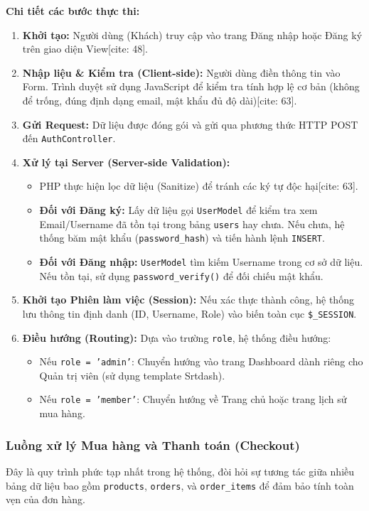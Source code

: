 \textbf{Chi tiết các bước thực thi:}
\begin{enumerate}
    \item \textbf{Khởi tạo:} Người dùng (Khách) truy cập vào trang Đăng nhập hoặc Đăng ký trên giao diện View[cite: 48].
    \item \textbf{Nhập liệu \& Kiểm tra (Client-side):} Người dùng điền thông tin vào Form. Trình duyệt sử dụng JavaScript để kiểm tra tính hợp lệ cơ bản (không để trống, đúng định dạng email, mật khẩu đủ độ dài)[cite: 63].
    \item \textbf{Gửi Request:} Dữ liệu được đóng gói và gửi qua phương thức HTTP POST đến \texttt{AuthController}.
    \item \textbf{Xử lý tại Server (Server-side Validation):} 
    \begin{itemize}
        \item PHP thực hiện lọc dữ liệu (Sanitize) để tránh các ký tự độc hại[cite: 63].
        \item \textbf{Đối với Đăng ký:} Lấy dữ liệu gọi \texttt{UserModel} để kiểm tra xem Email/Username đã tồn tại trong bảng \texttt{users} hay chưa. Nếu chưa, hệ thống băm mật khẩu (\texttt{password\_hash}) và tiến hành lệnh \texttt{INSERT}.
        \item \textbf{Đối với Đăng nhập:} \texttt{UserModel} tìm kiếm Username trong cơ sở dữ liệu. Nếu tồn tại, sử dụng \texttt{password\_verify()} để đối chiếu mật khẩu.
    \end{itemize}
    \item \textbf{Khởi tạo Phiên làm việc (Session):} Nếu xác thực thành công, hệ thống lưu thông tin định danh (ID, Username, Role) vào biến toàn cục \texttt{\$\_SESSION}.
    \item \textbf{Điều hướng (Routing):} Dựa vào trường \texttt{role}, hệ thống điều hướng:
    \begin{itemize}
        \item Nếu \texttt{role = 'admin'}: Chuyển hướng vào trang Dashboard dành riêng cho Quản trị viên (sử dụng template Srtdash).
        \item Nếu \texttt{role = 'member'}: Chuyển hướng về Trang chủ hoặc trang lịch sử mua hàng.
    \end{itemize}
\end{enumerate}

\subsubsection{Luồng xử lý Mua hàng và Thanh toán (Checkout)}
Đây là quy trình phức tạp nhất trong hệ thống, đòi hỏi sự tương tác giữa nhiều bảng dữ liệu bao gồm \texttt{products}, \texttt{orders}, và \texttt{order\_items} để đảm bảo tính toàn vẹn của đơn hàng.

